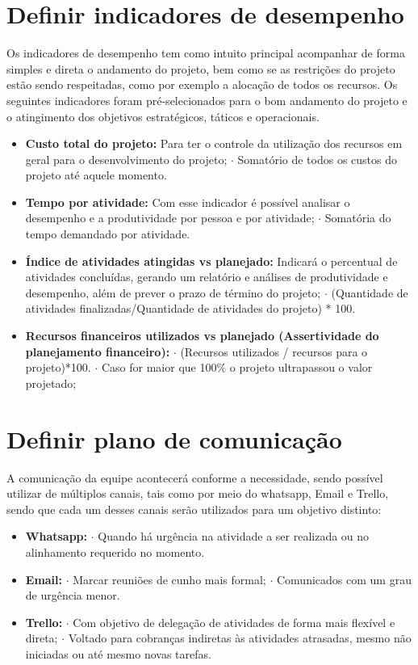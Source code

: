 \documentclass[
	12pt,				%
	openright,			%
	oneside,			%
	a4paper,			%
	english,			%
	french,				%
	spanish,			%
	brazil				%
	]{abntex2}
\begin{document}
\section{Definir indicadores de desempenho}

Os indicadores de desempenho tem como intuito principal acompanhar de forma simples e direta o andamento do projeto, bem como se as restrições do projeto estão sendo respeitadas, como por exemplo a alocação de todos os recursos. Os seguintes indicadores foram pré-selecionados para o bom andamento do projeto e o atingimento dos objetivos estratégicos, táticos e operacionais.

\begin{itemize}
\item \textbf{Custo total do projeto:} Para ter o controle da utilização dos recursos em geral para o desenvolvimento do projeto;
	\subitem $\cdot$ Somatório de todos os custos do projeto até aquele momento.
\item \textbf{Tempo por atividade:} Com esse indicador é possível analisar o desempenho e a produtividade por pessoa e por atividade;
	\subitem $\cdot$ Somatória do tempo demandado por atividade.
\item \textbf{Índice de atividades atingidas vs planejado:} Indicará o percentual de atividades concluídas, gerando um relatório e análises de produtividade e desempenho, além de prever o prazo de término do projeto;
	\subitem $\cdot$ (Quantidade de atividades finalizadas/Quantidade de atividades do projeto) * 100.
\item \textbf{Recursos financeiros utilizados vs planejado (Assertividade do planejamento financeiro):}
	\subitem $\cdot$ (Recursos utilizados / recursos para o projeto)*100.
		\subsubitem $\cdot$ Caso for maior que 100$\%$ o projeto ultrapassou o valor projetado;
\end{itemize}

\section{Definir plano de comunicação}

A comunicação da equipe acontecerá conforme a necessidade, sendo possível utilizar de múltiplos canais, tais como por meio do whatsapp, Email e Trello, sendo que cada um desses canais serão utilizados para um objetivo distinto:

\begin{itemize}
\item \textbf{Whatsapp:}
	\subitem $\cdot$ Quando há urgência na atividade a ser realizada ou no alinhamento requerido no momento.
\item \textbf{Email:} 	
	\subitem $\cdot$ Marcar reuniões de cunho mais formal;
	\subitem $\cdot$ Comunicados com um grau de urgência menor.
\item \textbf{Trello:}
	\subitem $\cdot$ Com objetivo de delegação de atividades de forma mais flexível e direta;
	\subitem $\cdot$ Voltado para cobranças indiretas às atividades atrasadas, mesmo não iniciadas ou até mesmo novas tarefas.
\end{itemize}
\end{document}
